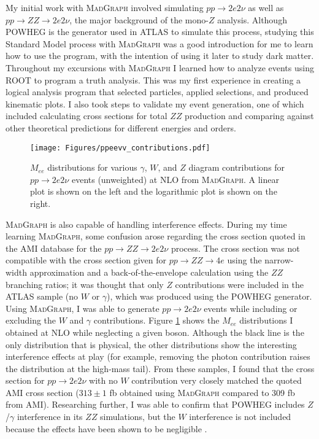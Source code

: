 My initial work with \textsc{MadGraph} involved simulating $pp \rightarrow 2e2\nu$ as well as $pp \rightarrow ZZ \rightarrow 2e2\nu$, the major background of the mono-$Z$ analysis. Although POWHEG is the generator used in ATLAS to simulate this process, studying this Standard Model process with \textsc{MadGraph} was a good introduction for me to learn how to use the program, with the intention of using it later to study dark matter. Throughout my excursions with \textsc{MadGraph} I learned how to analyze events using ROOT to program a truth analysis. This was my first experience in creating a logical analysis program that selected particles, applied selections, and produced kinematic plots. I also took steps to validate my event generation, one of which included calculating cross sections for total $ZZ$ production and comparing against other theoretical predictions for different energies and orders. 

\begin{figure}[hb]
\centering
\texttt{[image: Figures/ppeevv\_contributions.pdf]}
\caption[$M_{ee}$ distributions for various $\gamma$, $W$, and $Z$ diagram contributions for $pp \rightarrow 2e2\nu$ events (unweighted) at NLO from \textsc{MadGraph}]{$M_{ee}$ distributions for various $\gamma$, $W$, and $Z$ diagram contributions for $pp \rightarrow 2e2\nu$ events (unweighted) at NLO from \textsc{MadGraph}. A linear plot is shown on the left and the logarithmic plot is shown on the right.}
\label{fig:ppeevv_contributions}
\end{figure}

\textsc{MadGraph} is also capable of handling interference effects. During my time learning \textsc{MadGraph}, some confusion arose regarding the cross section quoted in the AMI database for the $pp \rightarrow ZZ \rightarrow 2e2\nu$ process. The cross section was not compatible with the cross section given for $pp \rightarrow ZZ \rightarrow 4e$ using the narrow-width approximation and a back-of-the-envelope calculation using the $ZZ$ branching ratios; it was thought that only $Z$ contributions were included in the ATLAS sample (no $W$ or $\gamma$), which was produced using the POWHEG generator. Using \textsc{MadGraph}, I was able to generate $pp \rightarrow 2e2\nu$ events while including or excluding the $W$ and $\gamma$ contributions. Figure \ref{fig:ppeevv_contributions} shows the $M_{ee}$ distributions I obtained at NLO while neglecting a given boson. Although the black line is the only distribution that is physical, the other distributions show the interesting interference effects at play (for example, removing the photon contribution raises the distribution at the high-mass tail). From these samples, I found that the cross section for $pp \rightarrow 2e2\nu$ with no $W$ contribution very closely matched the quoted AMI cross section ($313 \pm 1$ fb obtained using \textsc{MadGraph} compared to 309 fb from AMI). Researching further, I was able to confirm that POWHEG includes $Z$/$\gamma$ interference in its $ZZ$ simulations, but the $W$ interference is not included because the effects have been shown to be negligible \cite{Melia:2011tj}. 